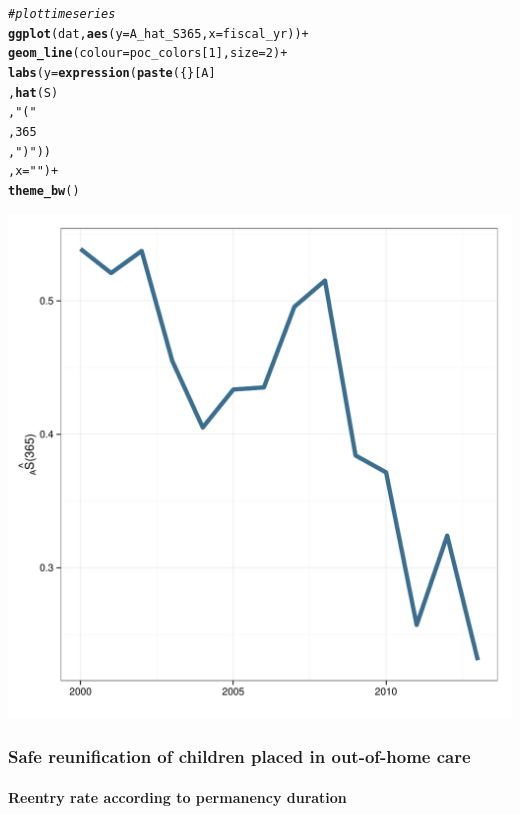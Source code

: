 \documentclass[12pt]{article}\usepackage[]{graphicx}\usepackage[]{color}
\makeatletter
\def\maxwidth{ %
  \ifdim\Gin@nat@width>\linewidth
    \linewidth
  \else
    \Gin@nat@width
  \fi
}
\newcommand{\hlnum}[1]{\textcolor[rgb]{0.686,0.059,0.569}{#1}}%
\newcommand{\hlstr}[1]{\textcolor[rgb]{0.192,0.494,0.8}{#1}}%
\newcommand{\hlcom}[1]{\textcolor[rgb]{0.678,0.584,0.686}{\textit{#1}}}%
\newcommand{\hlopt}[1]{\textcolor[rgb]{0,0,0}{#1}}%
\newcommand{\hlstd}[1]{\textcolor[rgb]{0.345,0.345,0.345}{#1}}%
\newcommand{\hlkwc}[1]{\textcolor[rgb]{0.333,0.667,0.333}{#1}}%
\newcommand{\hlkwd}[1]{\textcolor[rgb]{0.737,0.353,0.396}{\textbf{#1}}}%
\newenvironment{kframe}{%
 \def\at@end@of@kframe{}%
 \ifinner\ifhmode%
  \def\at@end@of@kframe{\end{minipage}}%
  \begin{minipage}{\columnwidth}%
 \fi\fi%
 \def\FrameCommand##1{\hskip\@totalleftmargin \hskip-\fboxsep
 \colorbox{shadecolor}{##1}\hskip-\fboxsep
     \hskip-\linewidth \hskip-\@totalleftmargin \hskip\columnwidth}%
 \MakeFramed {\advance\hsize-\width
   \@totalleftmargin\z@ \linewidth\hsize
   \@setminipage}}%
 {\par\unskip\endMakeFramed%
 \at@end@of@kframe}
\newenvironment{knitrout}{}{} %
\makeatother
\begin{document}
\begin{knitrout}
\begin{kframe}
\begin{alltt}
\hlcom{#plot time series}
\hlkwd{ggplot}\hlstd{(dat,} \hlkwd{aes}\hlstd{(}\hlkwc{y}\hlstd{=A_hat_S365,} \hlkwc{x}\hlstd{=fiscal_yr))} \hlopt{+}
  \hlkwd{geom_line}\hlstd{(}\hlkwc{colour}\hlstd{=poc_colors[}\hlnum{1}\hlstd{],} \hlkwc{size}\hlstd{=}\hlnum{2}\hlstd{)} \hlopt{+}
  \hlkwd{labs}\hlstd{(}\hlkwc{y} \hlstd{=} \hlkwd{expression}\hlstd{(}\hlkwd{paste}\hlstd{(\{\}[A]}
                            \hlstd{,}\hlkwd{hat}\hlstd{(S)}
                            \hlstd{,}\hlstr{"("}
                            \hlstd{,}\hlnum{365}
                            \hlstd{,}\hlstr{")"}\hlstd{))}
       \hlstd{,}\hlkwc{x} \hlstd{=} \hlstr{""}\hlstd{)} \hlopt{+}
  \hlkwd{theme_bw}\hlstd{()}
\end{alltt}
\end{kframe}
\includegraphics[width=\maxwidth]{figure/A_hat_S} 

\end{knitrout}


\subsubsection{Safe reunification of children placed in out-of-home care}
 
\paragraph{Reentry rate according to permanency duration}
 
\end{document}
